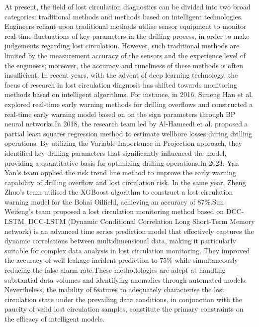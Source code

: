 \documentclass[journal,article,submit,pdftex,moreauthors]{Definitions/mdpi}
\begin{document}
At present, the field of lost circulation diagnostics can be divided into two broad categories: traditional methods and methods based on intelligent technologies. Engineers reliant upon traditional methods utilise sensor equipment to monitor real-time fluctuations of key parameters in the drilling process, in order to make judgements regarding lost circulation\cite{Saifulizan}. However, such traditional methods are limited by the measurement accuracy of the sensors and the experience level of the engineers; moreover, the accuracy and timeliness of these methods is often insufficient. In recent years, with the advent of deep learning technology, the focus of research in lost circulation diagnosis has shifted towards monitoring methods based on intelligent algorithms. For instance, in 2016, Simeng Han et al.\cite{simeng2016}  explored real-time early warning methods for drilling overflows and constructed a real-time early warning model based on on the sign parameters through BP neural networks.In 2018, the research team led by Al-Hameedi et al.\cite{alhameedi} proposed a partial least squares regression method to estimate wellbore losses during drilling operations. By utilizing the Variable Importance in Projection approach, they identified key drilling parameters that significantly influenced the model, providing a quantitative basis for optimizing drilling operations.In 2023, Yan Yan's team\cite{yandan2023} applied the risk trend line method to improve the early warning capability of drilling overflow and lost circulation risk. In the same year, Zheng Zhuo's team \cite{zhengzhuo2023}utilised the XGBoost algorithm to construct a lost circulation warning model for the Bohai Oilfield, achieving an accuracy of 87\%.Sun Weifeng's team \cite{sunweifeng2023} proposed a lost circulation monitoring method based on DCC-LSTM. DCC-LSTM (Dynamic Conditional Correlation Long Short-Term Memory network) is an advanced time series prediction model that effectively captures the dynamic correlations between multidimensional data, making it particularly suitable for complex data analysis in lost circulation monitoring. They improved the accuracy of well leakage incident prediction to 75\% while simultaneously reducing the false alarm rate.These methodologies are adept at handling substantial data volumes and identifying anomalies through automated models. Nevertheless, the inability of features to adequately characterise the lost circulation state under the prevailing data conditions, in conjunction with the paucity of valid lost circulation samples, constitute the primary constraints on the efficacy of intelligent models\cite{sunweifeng2023}.
\end{document}
